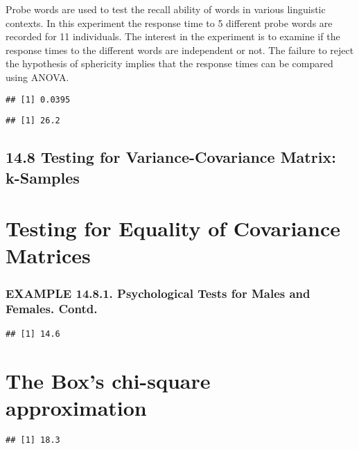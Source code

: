 \documentclass[]{article}
\begin{document}
Probe words are used to test the recall ability of words in various
linguistic contexts. In this experiment the response time to 5 different
probe words are recorded for 11 individuals. The interest in the
experiment is to examine if the response times to the different words
are independent or not. The failure to reject the hypothesis of
sphericity implies that the response times can be compared using ANOVA.

\begin{verbatim}
## [1] 0.0395
\end{verbatim}

\begin{verbatim}
## [1] 26.2
\end{verbatim}

\hypertarget{testing-for-variance-covariance-matrix-k-samples}{%
\subsection{14.8 Testing for Variance-Covariance Matrix:
k-Samples}\label{testing-for-variance-covariance-matrix-k-samples}}

\hypertarget{testing-for-equality-of-covariance-matrices}{%
\section{Testing for Equality of Covariance
Matrices}\label{testing-for-equality-of-covariance-matrices}}

\hypertarget{example-14.8.1.-psychological-tests-for-males-and-females.-contd.}{%
\subsubsection{EXAMPLE 14.8.1. Psychological Tests for Males and
Females.
Contd.}\label{example-14.8.1.-psychological-tests-for-males-and-females.-contd.}}

\begin{verbatim}
## [1] 14.6
\end{verbatim}

\hypertarget{the-boxs-chi-square-approximation}{%
\section{The Box's chi-square
approximation}\label{the-boxs-chi-square-approximation}}

\begin{verbatim}
## [1] 18.3
\end{verbatim}
\end{document}
